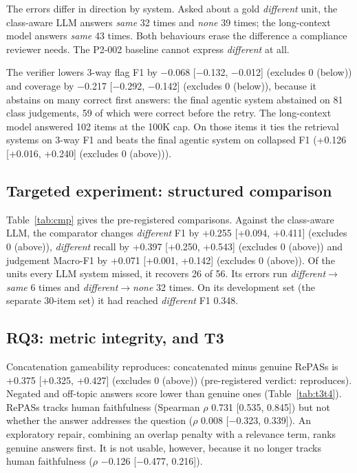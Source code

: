 \documentclass[conference]{IEEEtran}
\begin{document}
The errors differ in direction by system. Asked about a gold \textit{different} unit, the class-aware LLM answers
\textit{same} 32 times and \textit{none} 39 times; the long-context
model answers \textit{same} 43 times. Both behaviours erase the difference a compliance
reviewer needs. The P2-002 baseline cannot express \textit{different} at all.

The verifier lowers 3-way flag F1 by $-$0.068 [$-$0.132, $-$0.012] (excludes 0 (below)) and coverage by
$-$0.217 [$-$0.292, $-$0.142] (excludes 0 (below)), because it abstains on many correct first answers: the final agentic system abstained on 81 class
judgements, 59 of which were correct before the retry. The
long-context model answered 102 items at the 100K cap. On those items it ties the retrieval
systems on 3-way F1 and beats the final agentic system on collapsed F1
(+0.126 [+0.016, +0.240] (excludes 0 (above))).



\subsection{Targeted experiment: structured comparison}
Table~\ref{tab:cmp} gives the pre-registered comparisons. Against the class-aware LLM, the comparator changes \textit{different} F1 by +0.255 [+0.094, +0.411] (excludes 0 (above)), \textit{different} recall by +0.397 [+0.250, +0.543] (excludes 0 (above)) and judgement Macro-F1 by +0.071 [+0.001, +0.142] (excludes 0 (above)). Of the units every LLM system missed, it recovers 26 of 56. Its errors run \textit{different}$\rightarrow$\textit{same} 6 times and \textit{different}$\rightarrow$\textit{none} 32 times. On its development set (the separate 30-item set) it had reached \textit{different} F1 0.348.



\subsection{RQ3: metric integrity, and T3}
Concatenation gameability reproduces: concatenated minus genuine RePASs is
+0.375 [+0.325, +0.427] (excludes 0 (above)) (pre-registered verdict:
reproduces). Negated and off-topic answers score lower than genuine ones (Table~\ref{tab:t3t4}).
RePASs tracks human faithfulness (Spearman $\rho$ 0.731 [0.535, 0.845]) but not
whether the answer addresses the question ($\rho$ 0.008 [$-$0.323, 0.339]).
An exploratory repair, combining an overlap penalty with a relevance term, ranks genuine answers first. It is not usable, however,
because it no longer tracks human faithfulness ($\rho$ $-$0.126 [$-$0.477, 0.216]).
\end{document}
